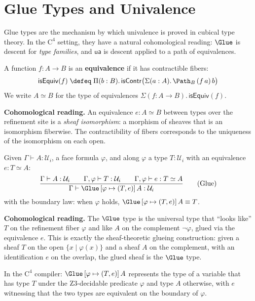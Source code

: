 \section{Glue Types and Univalence}
\label{sec:univalence}

Glue types are the mechanism by which univalence is proved in cubical type
theory.  In the $\mathrm{C}^4$ setting, they have a natural cohomological
reading: $\Glue$ is descent for \emph{type families}, and $\mathsf{ua}$
is descent applied to a path of equivalences.

\begin{definition}[Equivalence]
A function $f : A \to B$ is an \textbf{equivalence} if it has
contractible fibers:
\[
  \mathsf{isEquiv}(f) \;\defeq\;
  \Pi(b : B).\, \mathsf{isContr}\bigl(
    \Sigma(a : A).\, \Path_B\, (f\,a)\, b
  \bigr)
\]
We write $A \simeq B$ for the type of equivalences $\Sigma(f : A \to B).\,
\mathsf{isEquiv}(f)$.

\medskip\noindent\textbf{Cohomological reading.}  An equivalence
$e : A \simeq B$ between types over the refinement site is a
\emph{sheaf isomorphism}: a morphism of sheaves that is an isomorphism
fiberwise.  The contractibility of fibers corresponds to the uniqueness
of the isomorphism on each open.
\end{definition}

\begin{definition}
\label{def:glue}
Given $\Gamma \vdash A : \mathcal{U}_i$, a face formula $\varphi$, and
along $\varphi$ a type $T : \mathcal{U}_i$ with an equivalence
$e : T \simeq A$:
\[
  \frac{\Gamma \vdash A : \mathcal{U}_i \qquad
        \Gamma, \varphi \vdash T : \mathcal{U}_i \qquad
        \Gamma, \varphi \vdash e : T \simeq A}
       {\Gamma \vdash \Glue\,[\varphi \mapsto (T, e)]\, A
         : \mathcal{U}_i}
  \tag{Glue}
\]
with the boundary law: when $\varphi$ holds,
$\Glue\,[\varphi \mapsto (T, e)]\, A \equiv T$.

\medskip\noindent\textbf{Cohomological reading.}  The $\Glue$ type is the
universal type that ``looks like'' $T$ on the refinement fiber $\varphi$
and like $A$ on the complement $\neg\varphi$, glued via the equivalence
$e$.  This is exactly the sheaf-theoretic glueing construction: given a
sheaf $T$ on the open $\{x \mid \varphi(x)\}$ and a sheaf $A$ on the
complement, with an identification $e$ on the overlap, the glued sheaf
is the $\Glue$ type.

In the $\mathrm{C}^4$ compiler: $\Glue\,[\varphi \mapsto (T, e)]\, A$
represents the type of a variable that has type $T$ under the Z3-decidable
predicate $\varphi$ and type $A$ otherwise, with $e$ witnessing that the
two types are equivalent on the boundary of $\varphi$.
\end{definition}


